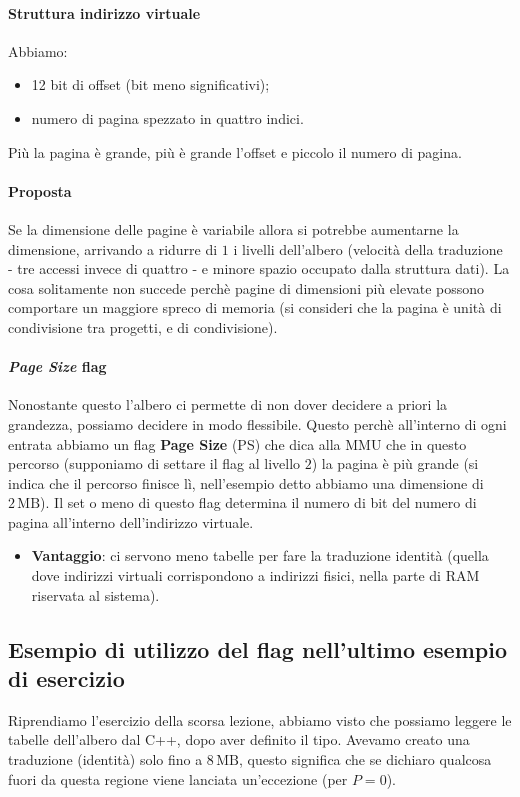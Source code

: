 \paragraph{Struttura indirizzo virtuale} Abbiamo:
\begin{itemize}
	\item 12 bit di offset (bit meno significativi);
	\item numero di pagina spezzato in quattro indici.
\end{itemize}
Più la pagina è grande, più è grande l'offset e piccolo il numero di pagina. 
\paragraph{Proposta} Se la dimensione delle pagine è variabile allora si potrebbe aumentarne la dimensione, arrivando a ridurre di $1$ i livelli dell'albero (velocità della traduzione - tre accessi invece di quattro - e minore spazio occupato dalla struttura dati). La cosa solitamente non succede perchè pagine di dimensioni più elevate possono comportare un maggiore spreco di memoria (si consideri che la pagina è unità di condivisione tra progetti, e di condivisione).

\paragraph{\emph{Page Size} flag} Nonostante questo l'albero ci permette di non dover decidere a priori la grandezza, possiamo decidere in modo flessibile. Questo perchè all'interno di ogni entrata abbiamo un flag \textbf{Page Size} (PS) che dica alla MMU che in questo percorso (supponiamo di settare il flag al livello $2$) la pagina è più grande (si indica che il percorso finisce lì, nell'esempio detto abbiamo una dimensione di $2\,\text{MB}$). Il set o meno di questo flag determina il numero di bit del numero di pagina all'interno dell'indirizzo virtuale.
\begin{itemize}
	\item \textbf{Vantaggio}: ci servono meno tabelle per fare la traduzione identità (quella dove indirizzi virtuali corrispondono a indirizzi fisici, nella parte di RAM riservata al sistema).
\end{itemize}

\subsection{Esempio di utilizzo del flag nell'ultimo esempio di esercizio}
Riprendiamo l'esercizio della scorsa lezione, abbiamo visto che possiamo leggere le tabelle dell'albero dal C++, dopo aver definito il tipo. Avevamo creato una traduzione (identità) solo fino a $8\,\text{MB}$, questo significa che se dichiaro qualcosa fuori da questa regione viene lanciata un'eccezione (per $P=0$).

